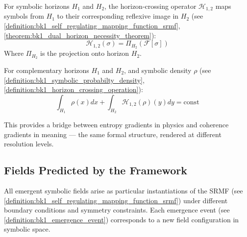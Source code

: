 \begin{definition}
\label{definition:bk1_horizon_crossing_operation}
For symbolic horizons $H_1$ and $H_2$, the horizon-crossing operator $\mathcal{H}_{1,2}$ maps symbols from $H_1$ to their corresponding reflexive image in $H_2$ (see \ref{definition:bk1_self_regulating_mapping_function_srmf}, \ref{theorem:bk1_dual_horizon_necessity_theorem}):
\[
\mathcal{H}_{1,2}(\sigma) = \Pi_{H_2}(\mathcal{F}[\sigma])
\]
Where $\Pi_{H_2}$ is the projection onto horizon $H_2$.
\end{definition}

\begin{lemma}
\label{lemma:bk1_horizon_crossing_conservation}
For complementary horizons $H_1$ and $H_2$, and symbolic density $\rho$ (see \ref{definition:bk1_symbolic_probabilty_density}, \ref{definition:bk1_horizon_crossing_operation}):
\[
\int_{H_1} \rho(x) dx + \int_{H_2} \mathcal{H}_{1,2}(\rho)(y) dy = \text{const}
\]
\end{lemma}

\begin{remark}
This provides a bridge between entropy gradients in physics and coherence gradients in meaning — the same formal structure, rendered at different resolution levels.
\end{remark}
\subsection{Fields Predicted by the Framework}
\label{subsec:bk1_fields_predicted_by_the_framework}

\begin{theorem}
\label{theorem:bk1_unified_field_classification}
All emergent symbolic fields arise as particular instantiations of the SRMF (see \ref{definition:bk1_self_regulating_mapping_function_srmf}) under different boundary conditions and symmetry constraints. Each emergence event (see \ref{definition:bk1_emergence_event}) corresponds to a new field configuration in symbolic space.
\end{theorem}

